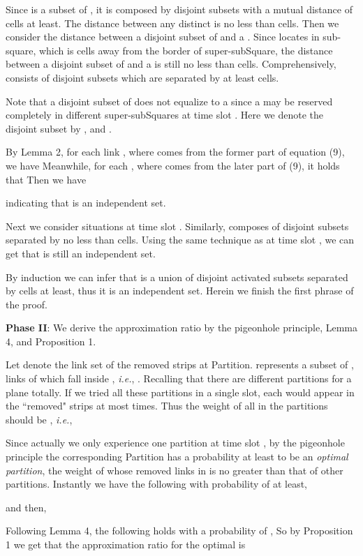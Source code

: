 \documentclass[journal]{IEEEtran}
\begin{document}
\begin{IEEEproof}
{{}}

Since  is a subset of , it is composed by disjoint subsets with a mutual distance of   cells at least. The distance between any distinct  is no less than  cells. Then we consider the distance between a disjoint subset of  and a . Since  locates in sub-square, which is  cells away from the border of super-subSquare, the distance between a disjoint subset of  and a  is still no less than  cells. Comprehensively,  consists of disjoint subsets
which are separated by at least  cells.

Note that a disjoint subset of  does not equalize to a  since a  may be reserved completely in different super-subSquares at time slot . Here we denote the disjoint subset by , and .

By Lemma 2, for each link , where  comes from
the former part of equation (9), we have
{\small{}}
Meanwhile, for each , where  comes
from
the later part of (9), it holds that
{\small{  }}
Then we have

indicating that  is an independent set.

Next we consider situations at time slot . Similarly,  composes of disjoint subsets separated by no less than   cells. Using the same technique as at time slot , we can get that  is still an independent set.

By induction we can infer that  is a union of disjoint activated subsets separated by   cells at least, thus it is an independent set. Herein we finish the first phrase of the proof.

\textbf{Phase II}: We derive the approximation ratio by the pigeonhole principle, Lemma 4, and Proposition 1.


Let  denote the link set of the removed strips at Partition.  represents a subset of , links of which fall inside , \emph{i.e.}, .  Recalling that there are  different partitions for a plane totally.
  If we tried all these partitions in a single slot, each  would appear in the ``removed" strips at most  times. Thus the weight of all  in the  partitions should be , \emph{i.e.},
    
 Since actually we only experience one partition at time slot ,  by the pigeonhole principle the corresponding  Partition has a probability at least  to be an \emph{optimal partition}, the weight of whose removed links in  is no greater than that of other partitions. Instantly we have the following with probability of  at least,

{\small{}}
and then,
{\small{

}}

Following Lemma 4, the following holds with a probability of ,
{\small{}}
So by Proposition 1 we get that the approximation ratio for the optimal is
{\small{}}
\end{IEEEproof}
\end{document}
